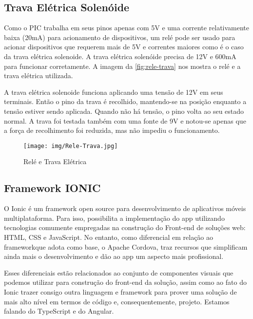 \documentclass[
	article,			%
	12pt,				%
	oneside,			%
	a4paper,            %
	twocolumn,
	english,			%
	brazil,				%
	sumario=tradicional
	]{abntex2}
\begin{document}
\subsection{Trava Elétrica Solenóide}
Como o PIC trabalha em seus pinos apenas com 5V e uma corrente relativamente baixa (20mA) para acionamento de dispositivos, um relé pode ser usado para acionar dispositivos que requerem mais de 5V e correntes maiores como é o caso da trava elétrica solenoide. A trava elétrica solenóide precisa de 12V e 600mA para funcionar corretamente. A imagem da \autoref{fig:rele-trava} nos mostra o relé e a trava elétrica utilizada.

A trava elétrica solenoide funciona aplicando uma tensão de 12V em seus terminais. Então o pino da trava é recolhido, mantendo-se na posição enquanto a tensão estiver sendo aplicada. Quando não há tensão, o pino volta ao seu estado normal. A trava foi testada também com uma fonte de 9V e notou-se apenas que a força de recolhimento foi reduzida, mas não impediu o funcionamento.

\begin{figure}
    \centering
    \begin{center}
        \texttt{[image: img/Rele-Trava.jpg]}
    \end{center}
    
    \caption{Relé e Trava Elétrica}
    \label{fig:rele-trava}
\end{figure}


\subsection{Framework IONIC}

O Ionic é um framework open source para desenvolvimento de aplicativos móveis multiplataforma. Para isso, possibilita a implementação do app utilizando tecnologias comumente empregadas na construção do Front-end de soluções web: HTML, CSS e JavaScript. No entanto, como diferencial em relação ao frameworkque adota como base, o Apache Cordova, traz recursos que simplificam ainda mais o desenvolvimento e dão ao app um aspecto mais profissional.

Esses diferenciais estão relacionados ao conjunto de componentes visuais que podemos utilizar para construção do front-end da solução, assim como ao fato do Ionic trazer consigo outra linguagem e framework para prover uma solução de mais alto nível em termos de código e, consequentemente, projeto. Estamos falando do TypeScript e do Angular.
\end{document}
